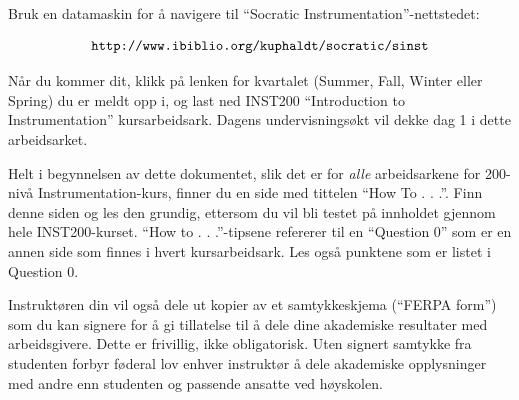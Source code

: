 
Bruk en datamaskin for å navigere til ``Socratic Instrumentation''-nettstedet:

$$\hbox{\tt http://www.ibiblio.org/kuphaldt/socratic/sinst}$$

Når du kommer dit, klikk på lenken for kvartalet (Summer, Fall, Winter eller Spring) du er meldt opp i, og last ned INST200 ``Introduction to Instrumentation'' kursarbeidsark.  Dagens undervisningsøkt vil dekke dag 1 i dette arbeidsarket.

\vskip 10pt

Helt i begynnelsen av dette dokumentet, slik det er for {\it alle} arbeidsarkene for 200-nivå Instrumentation-kurs, finner du en side med tittelen ``How To . . .''.  Finn denne siden og les den grundig, ettersom du vil bli testet på innholdet gjennom hele INST200-kurset.  ``How to . . .''-tipsene refererer til en ``Question 0'' som er en annen side som finnes i hvert kursarbeidsark.  Les også punktene som er listet i Question 0.



\vskip 10pt

Instruktøren din vil også dele ut kopier av et samtykkeskjema (``FERPA form'') som du kan signere for å gi tillatelse til å dele dine akademiske resultater med arbeidsgivere.  Dette er frivillig, ikke obligatorisk.  Uten signert samtykke fra studenten forbyr føderal lov enhver instruktør å dele akademiske opplysninger med andre enn studenten og passende ansatte ved høyskolen.

